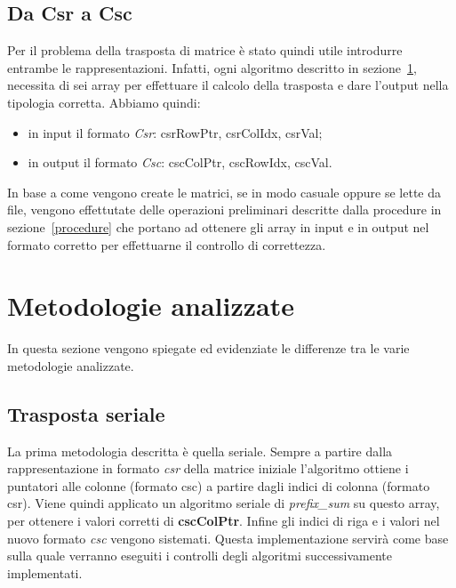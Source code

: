 \documentclass[]{IEEEtran}
\begin{document}
	\subsection{Da Csr a Csc}
	\label{csr-to-csc}
 	Per il problema della trasposta di matrice è stato quindi utile introdurre entrambe le rappresentazioni. Infatti, ogni algoritmo  descritto in sezione~\ref{metodologie}, necessita di sei array per effettuare il calcolo della trasposta e dare l'output nella tipologia corretta. Abbiamo quindi:
 	\begin{itemize}
 		\item in input il formato \textit{Csr}: csrRowPtr, csrColIdx, csrVal;
 		\item in output il formato \textit{Csc}: cscColPtr, cscRowIdx, cscVal.	
 	\end{itemize}
 	In base a come vengono create le matrici, se in modo casuale oppure se lette da file, vengono effettutate delle operazioni preliminari descritte dalla procedure in sezione~\ref{procedure} che portano ad ottenere gli array in input e in output nel formato corretto per effettuarne il controllo di correttezza.\newline

\section{Metodologie analizzate}
\label{metodologie}
	In questa sezione vengono spiegate ed evidenziate le differenze tra le varie metodologie analizzate. 
		
	\subsection{Trasposta seriale}
	La prima metodologia descritta è quella seriale. Sempre a partire dalla rappresentazione in formato \textit{csr} della matrice iniziale l'algoritmo ottiene i puntatori alle colonne (formato csc) a partire dagli indici di colonna (formato csr). Viene quindi applicato un algoritmo seriale di \textit{prefix\_sum} su questo array, per ottenere i valori corretti di \textbf{cscColPtr}. Infine gli indici di riga e i valori nel nuovo formato \textit{csc} vengono sistemati.\newline
	Questa implementazione servirà come base sulla quale verranno eseguiti i controlli degli algoritmi successivamente implementati.
	
\end{document}
